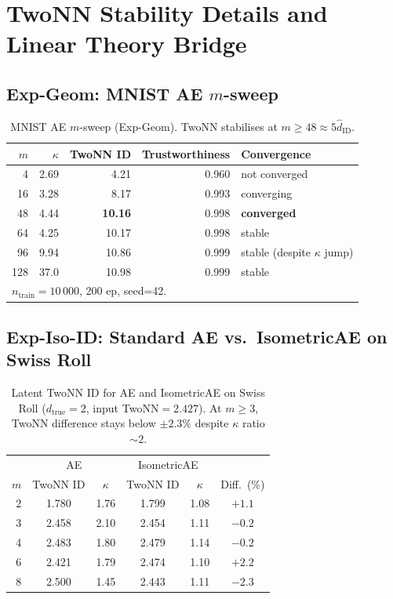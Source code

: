 \documentclass[11pt,a4paper]{article}
\newcommand{\kap}{\kappa}
\newcommand{\hatdID}{\hat{d}_{\mathrm{ID}}}
\begin{document}
\section{TwoNN Stability Details and Linear Theory Bridge}
\label{app:twonn_detail}

\subsection{Exp-Geom: MNIST AE $m$-sweep}

\begin{table}[H]
\centering
\caption{MNIST AE $m$-sweep (Exp-Geom). TwoNN stabilises at $m\geq48\approx5\hatdID$.}
\label{tab:eq_mnist}
\small
\begin{tabular}{rrrrl}
\toprule
$m$ & $\kap$ & TwoNN ID & Trustworthiness & Convergence \\
\midrule
 4  & 2.69 & 4.21 & 0.960 & not converged \\
16  & 3.28 & 8.17 & 0.993 & converging \\
48  & 4.44 & \textbf{10.16} & 0.998 & \textbf{converged} \\
64  & 4.25 & 10.17 & 0.998 & stable \\
96  & 9.94 & 10.86 & 0.999 & stable (despite $\kap$ jump) \\
128 & 37.0 & 10.98 & 0.999 & stable \\
\midrule
\multicolumn{5}{l}{\small $n_{\mathrm{train}}=10\,000$, 200 ep, seed=42.} \\
\bottomrule
\end{tabular}
\end{table}

\subsection{Exp-Iso-ID: Standard AE vs.\ IsometricAE on Swiss Roll}

\begin{table}[H]
\centering
\caption{Latent TwoNN ID for AE and IsometricAE on Swiss Roll
($d_{\mathrm{true}}=2$, input TwoNN$=2.427$).
At $m\geq3$, TwoNN difference stays below $\pm2.3\%$ despite $\kap$ ratio $\sim2$.}
\label{tab:iso_id}
\small
\begin{tabular}{r cc | cc | c}
\toprule
 & \multicolumn{2}{c|}{AE} & \multicolumn{2}{c|}{IsometricAE} & \\
$m$ & TwoNN ID & $\kap$ & TwoNN ID & $\kap$ & Diff.\ (\%) \\
\midrule
2 & 1.780 & 1.76 & 1.799 & 1.08 & $+1.1$ \\
3 & 2.458 & 2.10 & 2.454 & 1.11 & $-0.2$ \\
4 & 2.483 & 1.80 & 2.479 & 1.14 & $-0.2$ \\
6 & 2.421 & 1.79 & 2.474 & 1.10 & $+2.2$ \\
8 & 2.500 & 1.45 & 2.443 & 1.11 & $-2.3$ \\
\bottomrule
\end{tabular}
\end{table}
\end{document}
